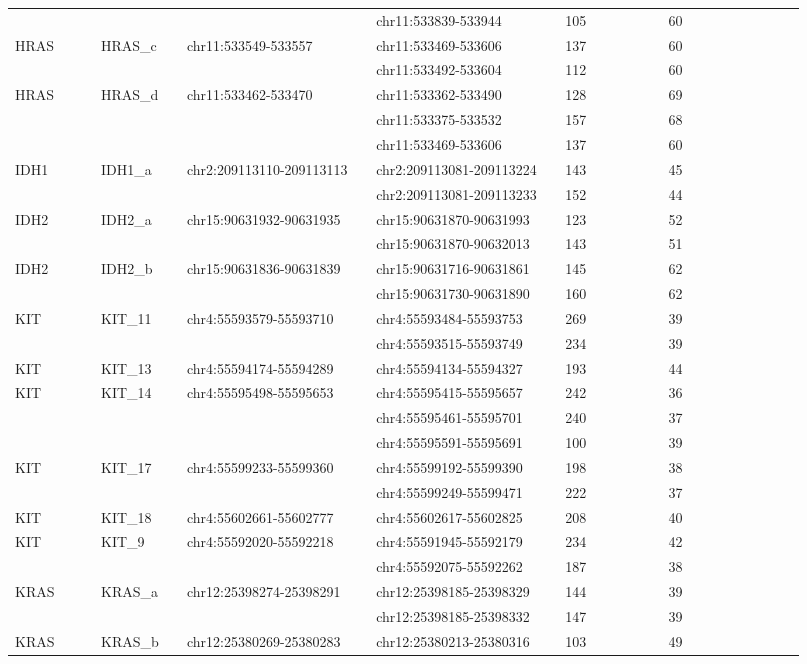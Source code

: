 \begin{landscape}
\begin{longtable}{p{0.1\linewidth}|p{0.1\linewidth}p{0.22\linewidth}p{0.22\linewidth}p{0.12\linewidth}p{0.16\linewidth}}
\\
 & & & chr11:533839-533944 & 105 & 60
\\
HRAS & HRAS\_c & chr11:533549-533557 & chr11:533469-533606 & 137 & 60
\\
 & & & chr11:533492-533604 & 112 & 60
\\
HRAS & HRAS\_d & chr11:533462-533470 & chr11:533362-533490 & 128 & 69
\\
 & & & chr11:533375-533532 & 157 & 68
\\
 & & & chr11:533469-533606 & 137 & 60
\\
\hline
IDH1 & IDH1\_a & chr2:209113110-209113113 & chr2:209113081-209113224 & 143 & 45
\\
 & & & chr2:209113081-209113233 & 152 & 44
\\
\hline
IDH2 & IDH2\_a & chr15:90631932-90631935 & chr15:90631870-90631993 & 123 & 52
\\
 & & & chr15:90631870-90632013 & 143 & 51
\\
IDH2 & IDH2\_b & chr15:90631836-90631839 & chr15:90631716-90631861 & 145 & 62
\\
 & & & chr15:90631730-90631890 & 160 & 62
\\
\hline
KIT & KIT\_11 & chr4:55593579-55593710 & chr4:55593484-55593753 & 269 & 39
\\
 & & & chr4:55593515-55593749 & 234 & 39
\\
KIT & KIT\_13 & chr4:55594174-55594289 & chr4:55594134-55594327 & 193 & 44
\\
KIT & KIT\_14 & chr4:55595498-55595653 & chr4:55595415-55595657 & 242 & 36
\\
 & & & chr4:55595461-55595701 & 240 & 37
\\
 & & & chr4:55595591-55595691 & 100 & 39
\\
KIT & KIT\_17 & chr4:55599233-55599360 & chr4:55599192-55599390 & 198 & 38
\\
 & & & chr4:55599249-55599471 & 222 & 37
\\
KIT & KIT\_18 & chr4:55602661-55602777 & chr4:55602617-55602825 & 208 & 40
\\
KIT & KIT\_9 & chr4:55592020-55592218 & chr4:55591945-55592179 & 234 & 42
\\
 & & & chr4:55592075-55592262 & 187 & 38
\\
\hline
KRAS & KRAS\_a & chr12:25398274-25398291 & chr12:25398185-25398329 & 144 & 39
\\
 & & & chr12:25398185-25398332 & 147 & 39
\\
KRAS & KRAS\_b & chr12:25380269-25380283 & chr12:25380213-25380316 & 103 & 49

\end{longtable}
\end{landscape}
